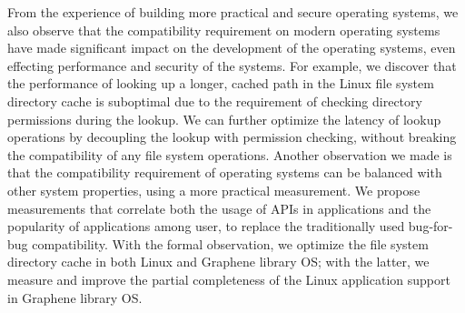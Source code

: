 From the experience of building more practical and secure operating systems,
we also observe that the compatibility requirement on modern operating systems have made significant impact
on the development of the operating systems,
even effecting performance and security of the systems.
For example, we discover that the performance of looking up a longer, cached path in the Linux file system directory cache
is suboptimal due to the requirement of checking directory permissions during the lookup.
We can further optimize the latency of lookup operations
by decoupling the lookup with permission checking,
without breaking the compatibility of any file system operations.
Another observation we made is that
the compatibility requirement of operating systems can be balanced with other system properties,
using a more practical measurement.
We propose measurements that correlate both the usage of APIs in applications
and the popularity of applications among user,
to replace the traditionally used bug-for-bug compatibility.
With the formal observation, we optimize the file system directory cache in both Linux and Graphene library OS;
with the latter, we measure and improve the partial completeness of the Linux application support in Graphene library OS. 


